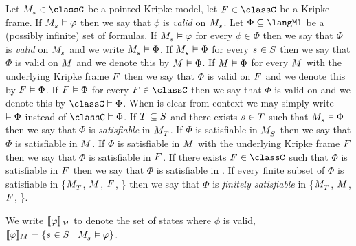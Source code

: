 Let $\kPModel{\kStateS} \in \classC$ be a pointed Kripke model,
let $\kFrame \in \classC$ be a Kripke frame.
If $\kPModel{\kStateS} \entails \phi$ then we say that $\phi$ is {\em valid} on $\kPModel{\kStateS}$.
Let $\Phi \subseteq \langMl$ be a (possibly infinite) set of formulas.
If $\kPModel{\kStateS} \entails \phi$ for every $\phi \in \Phi$ then we say that $\Phi$ is {\em valid} on $\kPModel{\kStateS}$ and we write $\kPModel{\kStateS} \entails \Phi$.
If $\kPModel{\kStateS} \entails \Phi$ for every $\kStateS \in \kStates$ then we say that $\Phi$ is valid on $\kModel$ and we denote this by $\kModel \entails \Phi$.
If $\kModel \entails \Phi$ for every $\kModel$ with the underlying Kripke frame $\kFrame$ then we say that $\Phi$ is valid on $\kFrame$ and we denote this by $\kFrame \entails \Phi$.
If $\kFrame \entails \Phi$ for every $\kFrame \in \classC$ then we say that $\Phi$ is valid on \classC{} and we denote this by $\classC \entails \Phi$.
When \classC{} is clear from context we may simply write $\vDash \Phi$ instead of $\classC \entails \Phi$.
If $\kStatesT \subseteq \kStates$ and there exists $\kStateS \in \kStatesT$ such that $\kPModel{\kStateS} \entails \Phi$ then we say that $\Phi$ is {\em satisfiable} in $\kPModel{\kStatesT}$.
If $\Phi$ is satisfiable in $\kPModel{\kStates}$ then we say that $\Phi$ is satisfiable in $\kModel$.
If $\Phi$ is satisfiable in $\kModel$ with the underlying Kripke frame $\kFrame$ then we say that $\Phi$ is satisfiable in $\kFrame$.
If there exists $\kFrame \in \classC$ such that $\Phi$ is satisfiable in $\kFrame$ then we say that $\Phi$ is satisfiable in \classC{}.
If every finite subset of $\Phi$ is satisfiable in \{$\kPModel{\kStatesT}$, $\kModel$, $\kFrame$, \classC{}\} then we say that $\Phi$ is {\em finitely satisfiable} in \{$\kPModel{\kStatesT}$, $\kModel$, $\kFrame$, \classC{}\}.

We write $\interpretation[\kModel]{\phi}$ to denote the set of states where $\phi$ is valid, $\interpretation[\kModel]{\phi} = \{\kStateS \in \kStates \mid \kPModel{\kStateS} \entails \phi\}$.

